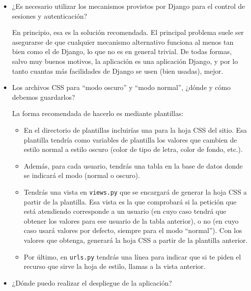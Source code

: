 \begin{itemize}
\item ¿Es necesario utilizar los mecanismos provistos por Django para el control de sesiones y autenticación?

  En principio, esa es la solución recomendada. El principal problema suele ser asegurarse de que cualquier mecanismo alternativo funciona al menos tan bien como el de Django, lo que no es en general trivial. De todas formas, salvo muy buenos motivos, la aplicación es una aplicación Django, y por lo tanto cuantas más facilidades de Django se usen (bien usadas), mejor.

\item Los archivos CSS para ``modo oscuro'' y ``modo normal'', ¿dónde y cómo debemos guardarlos?

  La forma recomendada de hacerlo es mediante plantillas:

  \begin{itemize}
  \item En el directorio de plantillas incluirías una para la hoja CSS del sitio. Esa plantilla tendría como variables de plantilla los valores que cambien de estilo normal a estilo oscuro (color de tipo de letra, color de fondo, etc.).
  \item Además, para cada usuario, tendrás una tabla en la base de datos donde se indicará el modo (normal o oscuro).
  \item Tendrás una vista en \texttt{views.py} que se encargará de generar la hoja CSS a partir de la plantilla. Esa vista es la que comprobará si la petición que está atendiendo corresponde a un usuario (en cuyo caso tendrá que obtener los valores para ese usuario de la tabla anterior), o no (en cuyo caso usará valores por defecto, siempre para el modo ``normal''). Con los valores que obtenga, generará la hoja CSS a partir de la plantilla anterior.
  \item Por último, en \texttt{urls.py} tendrás una línea para indicar que si te piden el recurso que sirve la hoja de estilo, llamas a la vista anterior.
  \end{itemize}

\item ¿Dónde puedo realizar el despliegue de la aplicación?


\end{itemize}
